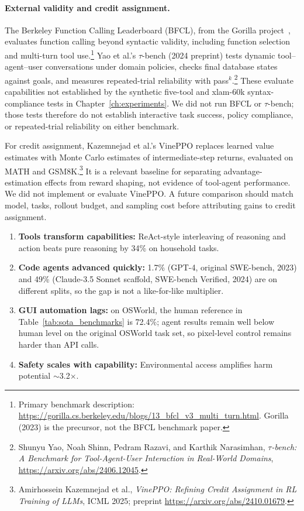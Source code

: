 \documentclass[12pt,a4paper]{report}
\theoremstyle{definition}
\begin{document}
\paragraph{External validity and credit assignment.}
The Berkeley Function Calling Leaderboard (BFCL), from the Gorilla project~\cite{patil2023gorilla}, evaluates function calling beyond syntactic validity, including function selection and multi-turn tool use.\footnote{Primary benchmark description: \url{https://gorilla.cs.berkeley.edu/blogs/13_bfcl_v3_multi_turn.html}. Gorilla (2023) is the precursor, not the BFCL benchmark paper.}
Yao et al.'s $\tau$-bench (2024 preprint) tests dynamic tool--agent--user conversations under domain policies, checks final database states against goals, and measures repeated-trial reliability with pass$^k$.\footnote{Shunyu Yao, Noah Shinn, Pedram Razavi, and Karthik Narasimhan, \textit{$\tau$-bench: A Benchmark for Tool-Agent-User Interaction in Real-World Domains}, \url{https://arxiv.org/abs/2406.12045}.}
These evaluate capabilities not established by the synthetic five-tool and xlam-60k syntax-compliance tests in Chapter~\ref{ch:experiments}. We did not run BFCL or $\tau$-bench; those tests therefore do not establish interactive task success, policy compliance, or repeated-trial reliability on either benchmark.

For credit assignment, Kazemnejad et al.'s VinePPO replaces learned value estimates with Monte Carlo estimates of intermediate-step returns, evaluated on MATH and GSM8K.\footnote{Amirhossein Kazemnejad et al., \textit{VinePPO: Refining Credit Assignment in RL Training of LLMs}, ICML 2025; preprint \url{https://arxiv.org/abs/2410.01679}.}
It is a relevant baseline for separating advantage-estimation effects from reward shaping, not evidence of tool-agent performance. We did not implement or evaluate VinePPO. A future comparison should match model, tasks, rollout budget, and sampling cost before attributing gains to credit assignment.

\begin{tcolorbox}[colback=green!5!white, colframe=green!60!black, title=\textbf{Chapter 3 Key Takeaways}]
\begin{enumerate}
    \item \textbf{Tools transform capabilities:} ReAct-style interleaving of reasoning and action beats pure reasoning by 34\% on household tasks.
    \item \textbf{Code agents advanced quickly:} 1.7\% (GPT-4, original SWE-bench, 2023) and 49\% (Claude-3.5 Sonnet scaffold, SWE-bench Verified, 2024) are on different splits, so the gap is not a like-for-like multiplier.
    \item \textbf{GUI automation lags:} on OSWorld, the human reference in Table~\ref{tab:sota_benchmarks} is 72.4\%; agent results remain well below human level on the original OSWorld task set, so pixel-level control remains harder than API calls.
    \item \textbf{Safety scales with capability:} Environmental access amplifies harm potential $\sim$3.2$\times$.
\end{enumerate}
\end{tcolorbox}
\end{document}
